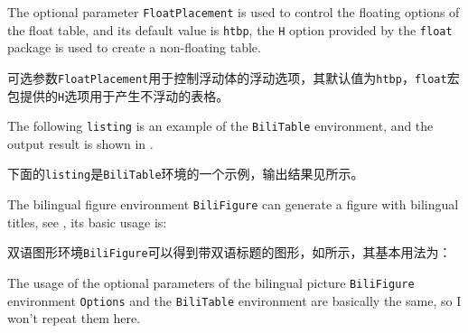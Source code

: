 \begin{ParaColumn}
    \switchcolumn*

    The optional parameter \verb"FloatPlacement" is used to control the floating options of the float table, and its default value is \verb"htbp", the \verb"H" option provided by the \verb"float" package is used to create a non-floating table.

    \switchcolumn

    可选参数\verb"FloatPlacement"用于控制浮动体的浮动选项，其默认值为\verb"htbp"，\verb"float"宏包提供的\verb"H"选项用于产生不浮动的表格。

    \switchcolumn*

    The following \verb"listing" is an example of the \verb"BiliTable" environment, and the output result is shown in .

    \switchcolumn

    下面的\verb"listing"是\verb"BiliTable"环境的一个示例，输出结果见所示。


    The bilingual figure environment \verb"BiliFigure" can generate a figure with bilingual titles, see , its basic usage is:
    
    \switchcolumn

    双语图形环境\verb"BiliFigure"可以得到带双语标题的图形，如所示，其基本用法为：

    \CrossColumnText{
        
        
    }
    \switchcolumn*

    The usage of the optional parameters of the bilingual picture  \verb"BiliFigure" environment \verb"Options" and the \verb"BiliTable" environment are basically the same, so I won't repeat them here.

    \switchcolumn


\end{ParaColumn}
